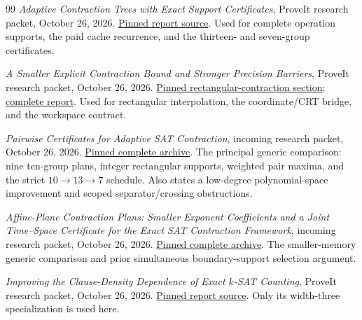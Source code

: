 \begin{thebibliography}{99}
\emph{Adaptive Contraction Trees with Exact Support Certificates}, ProveIt research packet, October 26, 2026. \href{https://github.com/VladimirReshetnikov/ProveIt/blob/8e76d515063c4b9fbd8743a846b457e3a01bc039/Computability/SubexponentialSAT/Research/sat_adaptive_tree_certificate/report.tex}{Pinned report source}. Used for complete operation supports, the paid cache recurrence, and the thirteen- and seven-group certificates.

\emph{A Smaller Explicit Contraction Bound and Stronger Precision Barriers}, ProveIt research packet, October 26, 2026. \href{https://github.com/VladimirReshetnikov/ProveIt/blob/8e76d515063c4b9fbd8743a846b457e3a01bc039/Computability/SubexponentialSAT/Research/subsat_rectangular/sections/rectangular.tex}{Pinned rectangular-contraction section}; \href{https://github.com/VladimirReshetnikov/ProveIt/blob/8e76d515063c4b9fbd8743a846b457e3a01bc039/Computability/SubexponentialSAT/Research/subsat_rectangular/report.pdf}{complete report}. Used for rectangular interpolation, the coordinate/CRT bridge, and the workspace contract.

\emph{Pairwise Certificates for Adaptive SAT Contraction}, incoming research packet, October 26, 2026. \href{https://github.com/VladimirReshetnikov/ProveIt/blob/8e76d515063c4b9fbd8743a846b457e3a01bc039/docs/incoming/sat_pairwise_certificates_2026-10-26.zip}{Pinned complete archive}. The principal generic comparison: nine ten-group plans, integer rectangular supports, weighted pair maxima, and the strict $10\to13\to7$ schedule. Also states a low-degree polynomial-space improvement and scoped separator/crossing obstructions.

\emph{Affine-Plane Contraction Plans: Smaller Exponent Coefficients and a Joint Time--Space Certificate for the Exact SAT Contraction Framework}, incoming research packet, October 26, 2026. \href{https://github.com/VladimirReshetnikov/ProveIt/blob/8e76d515063c4b9fbd8743a846b457e3a01bc039/docs/incoming/sat_affine_contraction_2026-10-26.zip}{Pinned complete archive}. The smaller-memory generic comparison and prior simultaneous boundary-support selection argument.

\emph{Improving the Clause-Density Dependence of Exact $k$-SAT Counting}, ProveIt research packet, October 26, 2026. \href{https://github.com/VladimirReshetnikov/ProveIt/blob/8e76d515063c4b9fbd8743a846b457e3a01bc039/Computability/SubexponentialSAT/Research/sat_density_improvement/density_aware_sat_improvement.tex}{Pinned report source}. Only its width-three specialization is used here.


\end{thebibliography}
